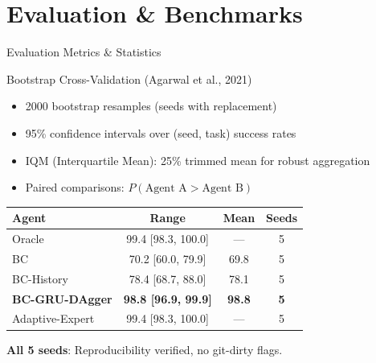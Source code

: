 \documentclass[10pt,aspectratio=16:9]{beamer}
\begin{document}
\section{Evaluation \& Benchmarks}

\begin{frame}{Evaluation Metrics \& Statistics}
  \vspace{-0.5em}
  \begin{block}{Bootstrap Cross-Validation (Agarwal et al., 2021)}
    \vspace{0.2em}
    \begin{itemize}
      \item 2000 bootstrap resamples (seeds with replacement)
      \item 95\% confidence intervals over (seed, task) success rates
      \item IQM (Interquartile Mean): 25\% trimmed mean for robust aggregation
      \item Paired comparisons: $P(\text{Agent A} > \text{Agent B})$
    \end{itemize}
    \vspace{0.2em}
  \end{block}

  \vspace{0.8em}

  \begin{table}
    \footnotesize
    \centering
    \begin{tabular}{l|c|c|c}
      \toprule
      \textbf{Agent} & \textbf{Range} & \textbf{Mean} & \textbf{Seeds} \\
      \midrule
      Oracle & 99.4 [98.3, 100.0] & — & 5 \\
      BC & 70.2 [60.0, 79.9] & 69.8 & 5 \\
      BC-History & 78.4 [68.7, 88.0] & 78.1 & 5 \\
      \textbf{BC-GRU-DAgger} & \textbf{98.8 [96.9, 99.9]} & \textbf{98.8} & \textbf{5} \\
      Adaptive-Expert & 99.4 [98.3, 100.0] & — & 5 \\
      \bottomrule
    \end{tabular}
  \end{table}

  \vspace{0.5em}

  \textbf{All 5 seeds}: Reproducibility verified, no git-dirty flags.
\end{frame}
\end{document}
